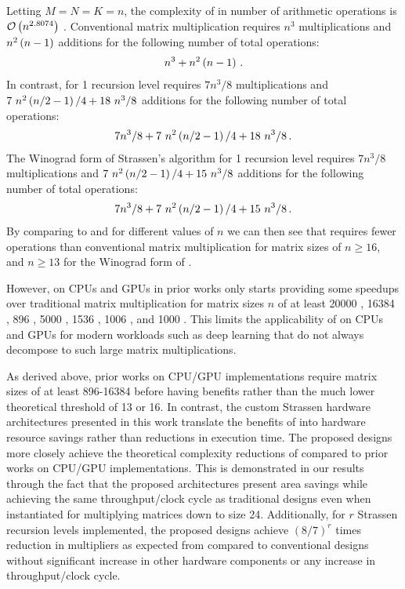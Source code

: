 Letting $M = N = K = n$, the complexity of \sa in number of arithmetic operations is $\mathcal{O}\left( n^{2.8074}\right)$ \cite{strassen1969gaussian}.
Conventional matrix multiplication  requires $n^3$ multiplications and $n^2\left( n-1 \right)$ additions for the following number of total operations:
\begin{align}
  \label{smm:eq:mm-ops}
  n^3 + n^2\left( n-1 \right) \,.
\end{align}
In contrast, \sa {} for 1 recursion level requires $7n^3/8$ multiplications and $7\text{ } n^2\left( n/2-1 \right)/4 + 18\text{ } n^3/8$ additions for the following number of total operations:
\begin{align}
  \label{smm:eq:smm-ops}
  7n^3/8 + 7\text{ } n^2\left( n/2-1 \right)/4 + 18\text{ } n^3/8 \,.
\end{align}
The Winograd form of Strassen's algorithm \cite{winograd1971multiplication} for 1 recursion level requires $7n^3/8$ multiplications and $7\text{ } n^2\left( n/2-1 \right)/4 + 15\text{ } n^3/8$ additions for the following number of total operations:
\begin{align}
  \label{smm:eq:swmm-ops}
  7n^3/8 + 7\text{ } n^2\left( n/2-1 \right)/4 + 15\text{ } n^3/8 \,.
\end{align}
By comparing  to  and  for different values of $n$ we can then see that \sa requires fewer operations than conventional matrix multiplication for matrix sizes of $n \ge 16$, and $n \ge 13$ for the Winograd form of \sa.

However, \sa on CPUs and GPUs in prior works only starts providing some speedups over traditional matrix multiplication for matrix sizes $n$ of at least 20000 \cite{sun2023accelerate}, 16384 \cite{misra2022stark}, 896 \cite{krishnan2021multi}, 5000 \cite{khaled2020applying}, 1536 \cite{huang2020strassen}, 1006 \cite{lai2013accelerating}, and 1000 \cite{lipshitz2012communication} \cite{ballard2012communication}.
This limits the applicability of \sa on CPUs and GPUs for modern workloads such as deep learning that do not always decompose to such large matrix multiplications.

As derived above, prior works on CPU/GPU implementations require matrix sizes of at least 896-16384 before having benefits rather than the much lower theoretical threshold of 13 or 16.
In contrast, the custom Strassen hardware architectures presented in this work translate the benefits of \sa into hardware resource savings rather than reductions in execution time.
The proposed designs more closely achieve the theoretical complexity reductions of \sa compared to prior works on CPU/GPU implementations.
This is demonstrated in our results through the fact that the proposed architectures present area savings while achieving the same throughput/clock cycle as traditional designs even when instantiated for multiplying matrices down to size 24.
Additionally, for $r$ Strassen recursion levels implemented, the proposed designs achieve $(8/7)^r$ times reduction in multipliers as expected from \seq compared to conventional designs without significant increase in other hardware components or any increase in throughput/clock cycle.

